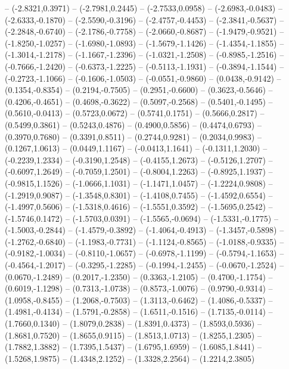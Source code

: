 {	-- (-2.8321,0.3971)
	-- (-2.7981,0.2445)
	-- (-2.7533,0.0958)
	-- (-2.6983,-0.0483)
	-- (-2.6333,-0.1870)
	-- (-2.5590,-0.3196)
	-- (-2.4757,-0.4453)
	-- (-2.3841,-0.5637)
	-- (-2.2848,-0.6740)
	-- (-2.1786,-0.7758)
	-- (-2.0660,-0.8687)
	-- (-1.9479,-0.9521)
	-- (-1.8250,-1.0257)
	-- (-1.6980,-1.0893)
	-- (-1.5679,-1.1426)
	-- (-1.4354,-1.1855)
	-- (-1.3014,-1.2178)
	-- (-1.1667,-1.2396)
	-- (-1.0321,-1.2508)
	-- (-0.8985,-1.2516)
	-- (-0.7666,-1.2420)
	-- (-0.6373,-1.2225)
	-- (-0.5113,-1.1931)
	-- (-0.3894,-1.1544)
	-- (-0.2723,-1.1066)
	-- (-0.1606,-1.0503)
	-- (-0.0551,-0.9860)
	-- (0.0438,-0.9142)
	-- (0.1354,-0.8354)
	-- (0.2194,-0.7505)
	-- (0.2951,-0.6600)
	-- (0.3623,-0.5646)
	-- (0.4206,-0.4651)
	-- (0.4698,-0.3622)
	-- (0.5097,-0.2568)
	-- (0.5401,-0.1495)
	-- (0.5610,-0.0413)
	-- (0.5723,0.0672)
	-- (0.5741,0.1751)
	-- (0.5666,0.2817)
	-- (0.5499,0.3861)
	-- (0.5243,0.4876)
	-- (0.4900,0.5856)
	-- (0.4474,0.6793)
	-- (0.3970,0.7680)
	-- (0.3391,0.8511)
	-- (0.2744,0.9281)
	-- (0.2034,0.9983)
	-- (0.1267,1.0613)
	-- (0.0449,1.1167)
	-- (-0.0413,1.1641)
	-- (-0.1311,1.2030)
	-- (-0.2239,1.2334)
	-- (-0.3190,1.2548)
	-- (-0.4155,1.2673)
	-- (-0.5126,1.2707)
	-- (-0.6097,1.2649)
	-- (-0.7059,1.2501)
	-- (-0.8004,1.2263)
	-- (-0.8925,1.1937)
	-- (-0.9815,1.1526)
	-- (-1.0666,1.1031)
	-- (-1.1471,1.0457)
	-- (-1.2224,0.9808)
	-- (-1.2919,0.9087)
	-- (-1.3548,0.8301)
	-- (-1.4108,0.7455)
	-- (-1.4592,0.6554)
	-- (-1.4997,0.5606)
	-- (-1.5318,0.4616)
	-- (-1.5551,0.3592)
	-- (-1.5695,0.2542)
	-- (-1.5746,0.1472)
	-- (-1.5703,0.0391)
	-- (-1.5565,-0.0694)
	-- (-1.5331,-0.1775)
	-- (-1.5003,-0.2844)
	-- (-1.4579,-0.3892)
	-- (-1.4064,-0.4913)
	-- (-1.3457,-0.5898)
	-- (-1.2762,-0.6840)
	-- (-1.1983,-0.7731)
	-- (-1.1124,-0.8565)
	-- (-1.0188,-0.9335)
	-- (-0.9182,-1.0034)
	-- (-0.8110,-1.0657)
	-- (-0.6978,-1.1199)
	-- (-0.5794,-1.1653)
	-- (-0.4564,-1.2017)
	-- (-0.3295,-1.2285)
	-- (-0.1994,-1.2455)
	-- (-0.0670,-1.2524)
	-- (0.0670,-1.2489)
	-- (0.2017,-1.2350)
	-- (0.3363,-1.2105)
	-- (0.4700,-1.1754)
	-- (0.6019,-1.1298)
	-- (0.7313,-1.0738)
	-- (0.8573,-1.0076)
	-- (0.9790,-0.9314)
	-- (1.0958,-0.8455)
	-- (1.2068,-0.7503)
	-- (1.3113,-0.6462)
	-- (1.4086,-0.5337)
	-- (1.4981,-0.4134)
	-- (1.5791,-0.2858)
	-- (1.6511,-0.1516)
	-- (1.7135,-0.0114)
	-- (1.7660,0.1340)
	-- (1.8079,0.2838)
	-- (1.8391,0.4373)
	-- (1.8593,0.5936)
	-- (1.8681,0.7520)
	-- (1.8655,0.9115)
	-- (1.8513,1.0713)
	-- (1.8255,1.2305)
	-- (1.7882,1.3882)
	-- (1.7395,1.5437)
	-- (1.6795,1.6959)
	-- (1.6085,1.8441)
	-- (1.5268,1.9875)
	-- (1.4348,2.1252)
	-- (1.3328,2.2564)
	-- (1.2214,2.3805)
}

